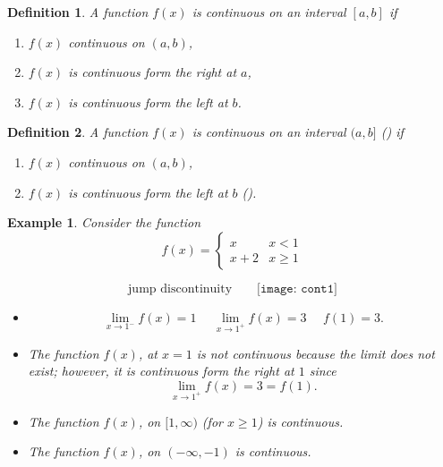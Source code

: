 \documentclass[12pt,a4paper]{book}
\newtheorem{Example}[theorem]{Example}
\numberwithin{equation}{section}
\newtheorem*{definition}{Definition}
\begin{document}
\begin{tcolorbox}[width=\textwidth,colback={green!20},title={},colbacktitle=yellow,coltitle=blue] 
\begin{definition}
	A function $f(x)$ is continuous on an interval $[a,b]$  if 
	\begin{enumerate}
		\item $f(x)$ continuous on $(a,b)$,
		\item $f(x)$ is continuous form the right at $a$,
		\item $f(x)$ is continuous form the left at $b$.
	\end{enumerate}
\end{definition}

\begin{definition}
	A function $f(x)$ is continuous on an interval $(a,b]$  ({\color{red}{on the interval $[a,b)$}})  if 
	\begin{enumerate}
		\item $f(x)$ continuous on $(a,b)$,
		\item $f(x)$ is continuous form the left at $b$ ({\color{red}{from the right at $a$}}).
	\end{enumerate}
\end{definition}
\end{tcolorbox}

\begin{tcolorbox}[width=\textwidth,colback={green!20},title={},colbacktitle=yellow,coltitle=blue] 
\begin{Example}
	Consider the function 
	$$f(x)=\begin{cases}
	x & x<1\\
	x+2 & x\geq 1
	\end{cases}$$
	\begin{mdframed}
		$$\text{jump discontinuity}\quad \quad 
	\texttt{[image: cont1]}
	$$
\end{mdframed}
	\begin{itemize}
		\item $$\lim_{x\to 1^{-}}f(x)=1~~~~~~\lim_{x\to 1^{+}}f(x)=3~~~~~~f(1)=3.$$
		\item The function $f(x)$, at $x=1$ is not continuous because the limit does not exist; however, it is continuous form the right at $1$ since 
		$$\lim_{x\to 1^{+}}f(x)=3=f(1).$$
		\item The function $f(x)$, on $[1,\infty)$ (for $x\geq 1$) is continuous.
		\item The function $f(x)$, on $(-\infty,-1)$ is continuous.
	\end{itemize}
\end{Example}
		\end{tcolorbox}
\end{document}
